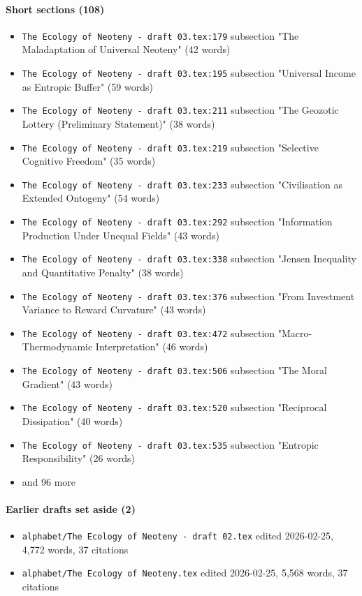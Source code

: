 \documentclass[11pt]{article}
\newcommand{\loc}[1]{{\small\color{muted}\texttt{#1}}}
\begin{document}
\paragraph{Short sections (108)}
\begin{itemize}
\item \loc{The Ecology of Neoteny - draft 03.tex:179} subsection "The Maladaptation of Universal Neoteny" (42 words)
\item \loc{The Ecology of Neoteny - draft 03.tex:195} subsection "Universal Income as Entropic Buffer" (59 words)
\item \loc{The Ecology of Neoteny - draft 03.tex:211} subsection "The Geozotic Lottery (Preliminary Statement)" (38 words)
\item \loc{The Ecology of Neoteny - draft 03.tex:219} subsection "Selective Cognitive Freedom" (35 words)
\item \loc{The Ecology of Neoteny - draft 03.tex:233} subsection "Civilisation as Extended Ontogeny" (54 words)
\item \loc{The Ecology of Neoteny - draft 03.tex:292} subsection "Information Production Under Unequal Fields" (43 words)
\item \loc{The Ecology of Neoteny - draft 03.tex:338} subsection "Jensen Inequality and Quantitative Penalty" (38 words)
\item \loc{The Ecology of Neoteny - draft 03.tex:376} subsection "From Investment Variance to Reward Curvature" (43 words)
\item \loc{The Ecology of Neoteny - draft 03.tex:472} subsection "Macro-Thermodynamic Interpretation" (46 words)
\item \loc{The Ecology of Neoteny - draft 03.tex:506} subsection "The Moral Gradient" (43 words)
\item \loc{The Ecology of Neoteny - draft 03.tex:520} subsection "Reciprocal Dissipation" (40 words)
\item \loc{The Ecology of Neoteny - draft 03.tex:535} subsection "Entropic Responsibility" (26 words)
\item[] {\color{muted}\small and 96 more}
\end{itemize}
\paragraph{Earlier drafts set aside (2)}
\begin{itemize}
\item \loc{alphabet/\allowbreak{}The Ecology of Neoteny - draft 02.tex} edited 2026-02-25, 4,772 words, 37 citations
\item \loc{alphabet/\allowbreak{}The Ecology of Neoteny.tex} edited 2026-02-25, 5,568 words, 37 citations
\end{itemize}
\end{document}

